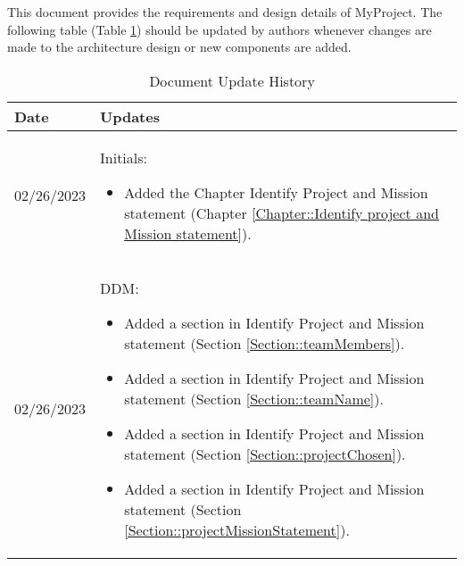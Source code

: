 This document provides the requirements and design details of MyProject.  
The following table (Table \ref{Table::UpdateHistory}) should be
updated by authors whenever changes are made to the architecture
design or new components are added.  

\begin{longtable}{|l||p{13.5cm}|}
\caption{Document Update History \label{Table::UpdateHistory}}\\
\hline
\textbf{Date} & \textbf{Updates} \\
\hline 
\endhead



02/26/2023 & Initials:
\begin{itemize}[topsep=0pt,itemsep=0pt,parsep=0pt,partopsep=0pt,leftmargin=12pt]
\item Added the Chapter Identify Project and Mission statement (Chapter \ref{Chapter::Identify project and Mission statement}). 
\end{itemize} 
\\ \hline

02/26/2023 & DDM:
\begin{itemize}[topsep=0pt,itemsep=0pt,parsep=0pt,partopsep=0pt,leftmargin=12pt]
\item Added a section in Identify Project and Mission statement (Section \ref{Section::teamMembers}).
\item Added a section in Identify Project and Mission statement (Section \ref{Section::teamName}).
\item Added a section in Identify Project and Mission statement (Section \ref{Section::projectChosen}).
\item Added a section in Identify Project and Mission statement (Section \ref{Section::projectMissionStatement}).
\end{itemize} 
\\ \hline



\end{longtable}
